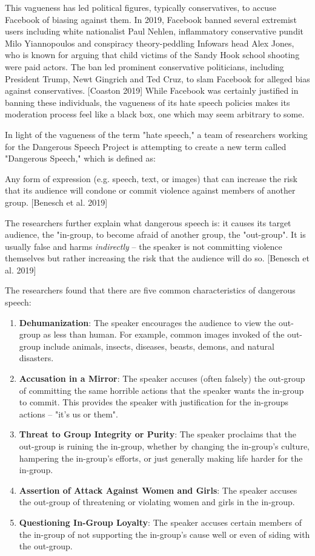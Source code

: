 \documentclass[class=book, crop=false]{standalone}
\begin{document}
This vagueness has led political figures, typically conservatives, to accuse Facebook of biasing against them. In 2019, Facebook banned several extremist users including white nationalist Paul Nehlen, inflammatory conservative pundit Milo Yiannopoulos and conspiracy theory-peddling Infowars head Alex Jones, who is known for arguing that child victims of the Sandy Hook school shooting were paid actors. The ban led prominent conservative politicians, including President Trump, Newt Gingrich and Ted Cruz, to slam Facebook for alleged bias against conservatives. [Coaston 2019] While Facebook was certainly justified in banning these individuals, the vagueness of its hate speech policies makes its moderation process feel like a black box, one which may seem arbitrary to some.

In light of the vagueness of the term "hate speech," a team of researchers working for the Dangerous Speech Project is attempting to create a new term called "Dangerous Speech," which is defined as:

\begin{displayquote}
Any form of expression (e.g. speech, text, or images) that can increase the risk that its audience will condone or commit violence against members of another group. [Benesch et al. 2019]
\end{displayquote}

The researchers further explain what dangerous speech is: it causes its target audience, the "in-group, to become afraid of another group, the "out-group". It is usually false and harms \textit{indirectly} -- the speaker is not committing violence themselves but rather increasing the risk that the audience will do so. [Benesch et al. 2019]

The researchers found that there are five common characteristics of dangerous speech:
\begin{enumerate}
    \item \textbf{Dehumanization}: The speaker encourages the audience to view the out-group as less than human. For example, common images invoked of the out-group include animals, insects, diseases, beasts, demons, and natural disasters.
    \item \textbf{Accusation in a Mirror}: The speaker accuses (often falsely) the out-group of committing the same horrible actions that the speaker wants the in-group to commit. This provides the speaker with justification for the in-groups actions -- "it's us or them".
    \item \textbf{Threat to Group Integrity or Purity}: The speaker proclaims that the out-group is ruining the in-group, whether by changing the in-group's culture, hampering the in-group's efforts, or just generally making life harder for the in-group.
    \item \textbf{Assertion of Attack Against Women and Girls}: The speaker accuses the out-group of threatening or violating women and girls in the in-group.
    \item \textbf{Questioning In-Group Loyalty}: The speaker accuses certain members of the in-group of not supporting the in-group's cause well or even of siding with the out-group.
\end{enumerate}
\end{document}

